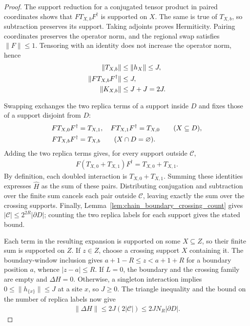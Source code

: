 \begin{proof}
    \leanok
    The support reduction for a conjugated tensor product in paired
    coordinates shows that $FT_{X,b}F^\dagger$ is supported on $X$.
    The same is true of $T_{X,b}$, so subtraction preserves its support.
    Taking adjoints proves Hermiticity. Pairing coordinates preserves
    the operator norm, and the regional swap satisfies $\|F\|\le1$.
    Tensoring with an identity does not increase the operator norm, hence
    \begin{align}
        \|T_{X,b}\|           & \le\|h_X\|\le J,\notag \\
        \|FT_{X,b}F^\dagger\| & \le J,\notag           \\
        \|K_{X,b}\|           & \le J+J=2J.
    \end{align}

    Swapping exchanges the two replica terms of a support inside $D$ and
    fixes those of a support disjoint from $D$:
    \begin{align}
        FT_{X,0}F^\dagger & =T_{X,1},\quad FT_{X,1}F^\dagger=T_{X,0}
        \qquad(X\subseteq D),\notag                                  \\
        FT_{X,b}F^\dagger & =T_{X,b}\qquad(X\cap D=\varnothing).
    \end{align}
    Adding the two replica terms gives, for every support
    outside $\mathcal C$,
    \begin{align}
        F(T_{X,0}+T_{X,1})F^\dagger=T_{X,0}+T_{X,1}.
    \end{align}
    By definition, each doubled interaction is $T_{X,0}+T_{X,1}$.
    Summing these identities expresses $\widehat H$ as the sum of these
    pairs. Distributing conjugation and subtraction over the finite sum
    cancels each pair outside $\mathcal C$, leaving exactly the sum over
    the crossing supports. Finally, Lemma~\ref{lem:chain_boundary_crossing_count}
    gives $|\mathcal C|\le2^{2R}|\partial D|$; counting the two replica
    labels for each support gives the stated bound.

    Each term in the resulting expansion is supported on some
    $X\subseteq Z$, so their finite sum is supported on $Z$. If $z\in Z$,
    choose a crossing support $X$ containing it. The boundary-window
    inclusion gives $a+1-R\le z<a+1+R$ for a boundary position
    $a$, whence $|z-a|\le R$.
    If $L=0$, the boundary and the crossing family are empty and
    $\Delta H=0$. Otherwise, a singleton interaction implies
    $0\le\|h_{\{x\}}\|\le J$ at a site $x$, so $J\ge0$.
    The triangle inequality and the bound on the number of replica labels
    now give
    \begin{align}
        \|\Delta H\|\le 2J(2|\mathcal C|)\le 2J N_R|\partial D|.
    \end{align}
\end{proof}

